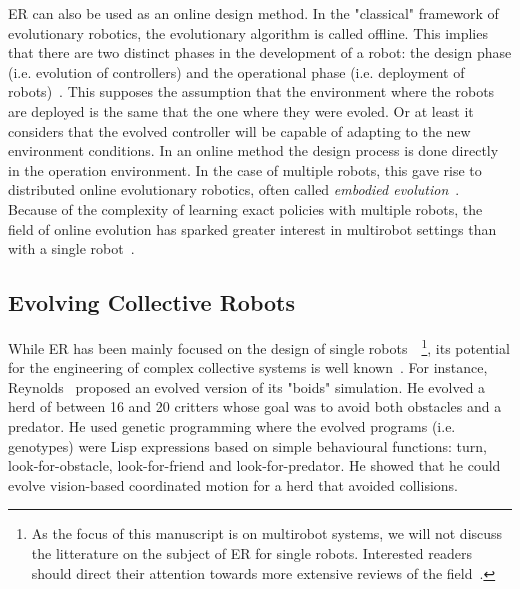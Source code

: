     ER can also be used as an online design method. In the "classical" framework of evolutionary robotics, the evolutionary algorithm is called offline. This implies that there are two distinct phases in the development of a robot: the design phase (i.e. evolution of controllers) and the operational phase (i.e. deployment of robots)~\parencite{Doncieux2015a, Francesca2016}. This supposes the assumption that the environment where the robots are deployed is the same that the one where they were evoled. Or at least it considers that the evolved controller will be capable of adapting to the new environment conditions. In an online method the design process is done directly in the operation environment. In the case of multiple robots, this gave rise to distributed online evolutionary robotics, often called \emph{embodied evolution}~\parencite{Ficici1999, Watson2002}. Because of the complexity of learning exact policies with multiple robots, the field of online evolution has sparked greater interest in multirobot settings than with a single robot~\parencite{Doncieux2015a}.


  \subsection{Evolving Collective Robots}

    While ER has been mainly focused on the design of single robots~\parencite{Nolfi2000, Doncieux2015a}~\footnote{As the focus of this manuscript is on multirobot systems, we will not discuss the litterature on the subject of ER for single robots. Interested readers should direct their attention towards more extensive reviews of the field~\parencite{Floreano2008, Bongard2013a, Trianni2014, Doncieux2015a}.}, its potential for the engineering of complex collective systems is well known~\parencite{Baldassarre2003}. For instance, Reynolds~\parencite{Reynolds1992} proposed an evolved version of its "boids" simulation. He evolved a herd of between 16 and 20 critters whose goal was to avoid both obstacles and a predator. He used genetic programming where the evolved programs (i.e. genotypes) were Lisp expressions based on simple behavioural functions: turn, look-for-obstacle, look-for-friend and look-for-predator. He showed that he could evolve vision-based coordinated motion for a herd that avoided collisions.

